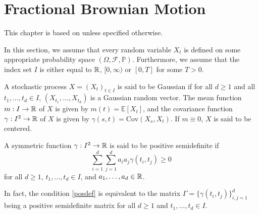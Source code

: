 \chapter{Fractional Brownian Motion}
This chapter is based on \cite{fBMbook} unless specified otherwise.

In this section, we assume that every random variable $X_{t}$ is defined on some appropriate probability space $(\Omega, \mathcal{F},\mathbb{P})$. Furthermore, we assume that the index set $I$ is either equal to $\mathbb{R}$, $[0,\infty)$ or $[0,T]$ for some $T>0$. 
\begin{defn}
    A stochastic process $X=(X_{t})_{t\in I}$ is said to be Gaussian if for all $d\geq 1$ and all $t_{1},\dots,t_{d}\in I$, $(X_{t_{1}},\dots,X_{t_{d}})$ is a Gaussian random vector. The mean function $m: I\to \mathbb{R}$ of $X$ is given by $m(t)=\mathbb{E}[X_{t}]$, and the covariance function $\gamma: I^{2}\to\mathbb{R}$ of $X$ is given by $\gamma(s,t)=\textrm{Cov}(X_{s},X_{t})$. If $m\equiv 0$, $X $ is said to be centered.
\end{defn}

\begin{defn}
    A symmetric function $\gamma: I^{2}\to \mathbb{R}$ is said to be positive semidefinite if
    \begin{equation}\label{posdef}
        \sum_{i=1}^{d}\sum_{j=1}^{d}a_{i}a_{j}\gamma(t_{i},t_{j})\geq 0
    \end{equation}
    for all $d\geq 1$, $t_{1},\dots,t_{d}\in I$, and $a_{1},\dots,a_{d}\in\mathbb{R}$.
\end{defn}
In fact, the condition \eqref{posdef} is equivalent to the matrix $\Gamma=\big\{\gamma (t_{i},t_{j})\big\}_{i,j=1}^{d}$ being a positive semidefinite matrix for all $d\geq 1$ and $t_{1},\dots,t_{d}\in I$.

